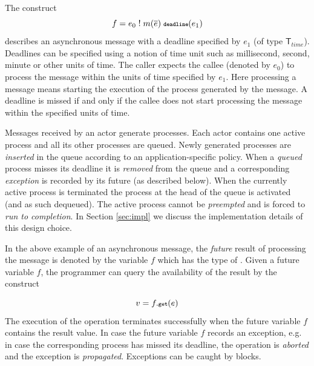 The construct
$$
f = e_0 \; ! \; m(\overline{e}) \; \textbf{{\scriptsize\texttt{deadline}}}(e_1)
$$
describes an asynchronous message with a deadline specified by $e_1$ (of type $\mathsf{T}_{time}$).
Deadlines  can be specified  using a notion of time unit such as millisecond, second, minute or other units of time.
The caller expects the  callee (denoted by $e_0$) to process   the message  within the  units of time
specified by $e_1$.
Here processing a message means starting the execution of the process generated by the message.
A deadline  is missed if and only if the callee  does not  start  processing  the message within the specified units of time.

Messages received by an actor generate processes.
Each actor contains one active process and all its other processes are queued. 
Newly generated processes are \emph{inserted} in the queue according to an application-specific policy.
When a \emph{queued} process misses its deadline it is \emph{removed} from the queue and a
corresponding \emph{exception} is recorded by its future (as described below).
When the currently active process is terminated the process at the head of the queue is activated
(and as such  dequeued).
The active process  cannot be \emph{preempted} and is forced
to  \emph{run to completion}.
In  Section \ref{sec:impl} we discuss the implementation details of this design choice.

In the above example of an asynchronous message, the \emph{future} result of processing the  message   
is denoted by the  variable $f$ which has the type of \textbf{}.
Given a future variable $f$, the programmer can query  the  availability of the  result by the construct

$$
v = f.{\textnormal{\textbf{{\scriptsize\texttt{get}}}}}(e)
$$
The execution of the \gett \space operation terminates successfully when  the future variable $f$ contains the result value.
In case the future variable $f$ records an exception, e.g. in case the corresponding process has missed its  deadline,
the \gett\space operation is \emph{aborted} and the exception is \emph{propagated}. 
Exceptions can be caught by  blocks. 

